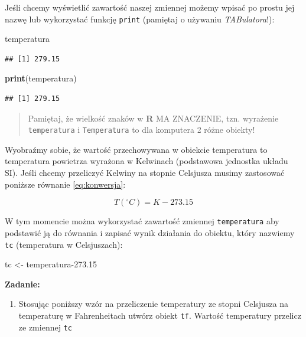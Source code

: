 \documentclass[]{book}
\newenvironment{Shaded}{\begin{snugshade}}{\end{snugshade}}
\newcommand{\KeywordTok}[1]{\textcolor[rgb]{0.13,0.29,0.53}{\textbf{#1}}}
\newcommand{\FloatTok}[1]{\textcolor[rgb]{0.00,0.00,0.81}{#1}}
\newcommand{\StringTok}[1]{\textcolor[rgb]{0.31,0.60,0.02}{#1}}
\newcommand{\NormalTok}[1]{#1}
\providecommand{\tightlist}{%
  \setlength{\itemsep}{0pt}\setlength{\parskip}{0pt}}
\theoremstyle{definition}
\theoremstyle{definition}
\theoremstyle{definition}
\theoremstyle{remark}
\begin{document}
Jeśli chcemy wyświetlić zawartość naszej zmiennej możemy wpisać po
prostu jej nazwę lub wykorzystać funkcję \texttt{print} (pamiętaj o
używaniu \emph{TABulatora}!):

\begin{Shaded}
\begin{Highlighting}[]
\NormalTok{temperatura}
\end{Highlighting}
\end{Shaded}

\begin{verbatim}
## [1] 279.15
\end{verbatim}

\begin{Shaded}
\begin{Highlighting}[]
\KeywordTok{print}\NormalTok{(temperatura)}
\end{Highlighting}
\end{Shaded}

\begin{verbatim}
## [1] 279.15
\end{verbatim}

\begin{quote}
Pamiętaj, że wielkość znaków w \textbf{R} MA ZNACZENIE, tzn. wyrażenie
\texttt{temperatura} i \texttt{Temperatura} to dla komputera 2 różne
obiekty!
\end{quote}

Wyobraźmy sobie, że wartość przechowywana w obiekcie temperatura to
temperatura powietrza wyrażona w Kelwinach (podstawowa jednostka układu
SI). Jeśli chcemy przeliczyć Kelwiny na stopnie Celsjusza musimy
zastosować poniższe równanie \eqref{eq:konwersja}:

\begin{equation} 
  T(^\circ C) = K-273.15
  \label{eq:konwersja}
\end{equation}

W tym momencie można wykorzystać zawartość zmiennej \texttt{temperatura}
aby podstawić ją do równania i zapisać wynik działania do obiektu, który
nazwiemy \texttt{tc} (temperatura w Celsjuszach):

\begin{Shaded}
\begin{Highlighting}[]
\NormalTok{tc <-}\StringTok{ }\NormalTok{temperatura}\FloatTok{-273.15}
\end{Highlighting}
\end{Shaded}

\textbf{Zadanie:}

\begin{enumerate}
\def\labelenumi{\arabic{enumi}.}
\tightlist
\item
  Stosując poniższy wzór na przeliczenie temperatury ze stopni Celsjusza
  na temperaturę w Fahrenheitach utwórz obiekt \texttt{tf}. Wartość
  temperatury przelicz ze zmiennej \texttt{tc}
\end{enumerate}
\end{document}
